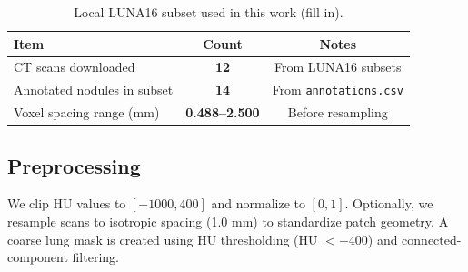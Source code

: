 \begin{table}[H]
\centering
\caption{Local LUNA16 subset used in this work (fill in).}
\label{tab:subset}
\begin{tabular}{lcc}
\toprule
Item & Count & Notes \\
\midrule
CT scans downloaded & \textbf{12} & From LUNA16 subsets \\
Annotated nodules in subset & \textbf{14} & From \texttt{annotations.csv} \\
Voxel spacing range (mm) & \textbf{0.488--2.500} & Before resampling \\
\bottomrule
\end{tabular}
\end{table}

\subsection{Preprocessing}
We clip HU values to $[-1000, 400]$ and normalize to $[0,1]$. Optionally, we resample scans to isotropic spacing (1.0 mm) to standardize patch geometry. A coarse lung mask is created using HU thresholding (HU $<-400$) and connected-component filtering.